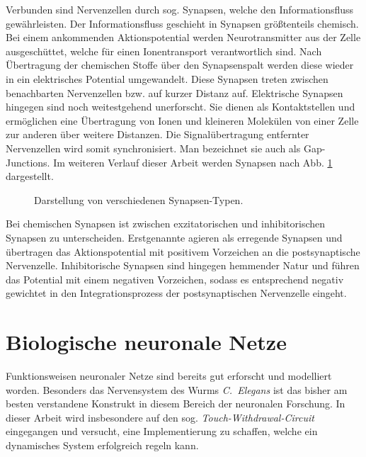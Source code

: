 	Verbunden sind Nervenzellen durch sog. Synapsen, welche den Informationsfluss gewährleisten. Der Informationsfluss geschieht in Synapsen größtenteils chemisch. Bei einem ankommenden Aktionspotential werden Neurotransmitter aus der Zelle ausgeschüttet, welche für einen Ionentransport verantwortlich sind. Nach Übertragung der chemischen Stoffe über den Synapsenspalt werden diese wieder in ein elektrisches Potential umgewandelt. Diese Synapsen treten zwischen benachbarten Nervenzellen bzw. auf kurzer Distanz auf. Elektrische Synapsen hingegen sind noch weitestgehend unerforscht. Sie dienen als Kontaktstellen und ermöglichen eine Übertragung von Ionen und kleineren Molekülen von einer Zelle zur anderen über weitere Distanzen. Die Signalübertragung entfernter Nervenzellen wird somit synchronisiert. Man bezeichnet sie auch als \glqq Gap-Junctions\grqq. Im weiteren Verlauf dieser Arbeit werden Synapsen nach Abb. \ref{fig:synapse} dargestellt.
	\begin{figure}[H] %
		\centering
		\def\svgwidth{12cm}
		
		\caption{Darstellung von verschiedenen Synapsen-Typen.}
		\label{fig:synapse}
	\end{figure}
	Bei chemischen Synapsen ist zwischen exzitatorischen und inhibitorischen Synapsen zu unterscheiden. Erstgenannte agieren als erregende Synapsen und übertragen das Aktionspotential mit positivem Vorzeichen an die postsynaptische Nervenzelle. Inhibitorische Synapsen sind hingegen hemmender Natur und führen das Potential mit einem negativen Vorzeichen, sodass es entsprechend negativ gewichtet in den Integrationsprozess der postsynaptischen Nervenzelle eingeht.
\section{Biologische neuronale Netze}
\label{sec:neuro_netz}
	Funktionsweisen neuronaler Netze sind bereits gut erforscht und modelliert worden. Besonders das Nervensystem des Wurms \textit{C.~Elegans} \cite{CElegans} ist das bisher am besten verstandene Konstrukt in diesem Bereich der neuronalen Forschung. In dieser Arbeit wird insbesondere auf den sog. \textit{Touch-Withdrawal-Circuit} eingegangen und versucht, eine Implementierung zu schaffen, welche ein dynamisches System erfolgreich regeln kann.
	
